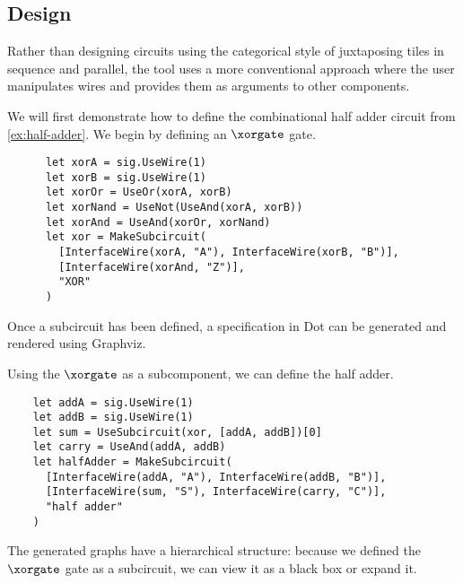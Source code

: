 \subsection{Design}

Rather than designing circuits using the categorical style of juxtaposing
tiles in sequence and parallel, the tool uses a more conventional approach
where the user manipulates wires and provides them as arguments to other
components.

\begin{example}
  We will first demonstrate how to define the combinational half adder circuit
  from \cref{ex:half-adder}.
  We begin by defining an \(\xorgate\) gate.
  \begin{lstlisting}
      let xorA = sig.UseWire(1)
      let xorB = sig.UseWire(1)
      let xorOr = UseOr(xorA, xorB)
      let xorNand = UseNot(UseAnd(xorA, xorB))
      let xorAnd = UseAnd(xorOr, xorNand)
      let xor = MakeSubcircuit(
        [InterfaceWire(xorA, "A"), InterfaceWire(xorB, "B")],
        [InterfaceWire(xorAnd, "Z")],
        "XOR"
      )
    \end{lstlisting}

  Once a subcircuit has been defined, a specification in Dot can be generated
  and rendered using Graphviz.

  \begin{center}
    
  \end{center}

  Using the \(\xorgate\) as a subcomponent, we can define the half adder.

  \begin{lstlisting}
    let addA = sig.UseWire(1)
    let addB = sig.UseWire(1)
    let sum = UseSubcircuit(xor, [addA, addB])[0]
    let carry = UseAnd(addA, addB)
    let halfAdder = MakeSubcircuit(
      [InterfaceWire(addA, "A"), InterfaceWire(addB, "B")],
      [InterfaceWire(sum, "S"), InterfaceWire(carry, "C")],
      "half adder"
    )
    \end{lstlisting}

  The generated graphs have a hierarchical structure: because we defined the
  \(\xorgate\) gate as a subcircuit, we can view it as a black box or
  expand it.

  \begin{center}
    

    \vspace{1em}

    
  \end{center}
\end{example}

